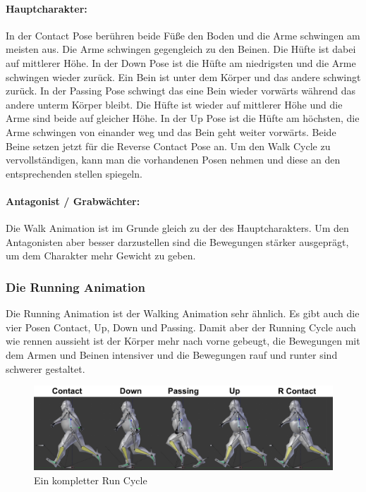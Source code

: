 \paragraph{Hauptcharakter:}
In der Contact Pose berühren beide Füße den Boden und die Arme schwingen am meisten aus. Die Arme schwingen gegengleich zu den Beinen.
Die Hüfte ist dabei auf mittlerer Höhe. In der Down Pose ist die Hüfte am niedrigsten und die Arme schwingen wieder zurück.
Ein Bein ist unter dem Körper und das andere schwingt zurück. In der Passing Pose schwingt das eine Bein wieder vorwärts während
das andere unterm Körper bleibt. Die Hüfte ist wieder auf mittlerer Höhe und die Arme sind beide auf gleicher Höhe. In der Up Pose
ist die Hüfte am höchsten, die Arme schwingen von einander weg und das Bein geht weiter vorwärts. Beide Beine setzen jetzt
für die Reverse Contact Pose an. Um den Walk Cycle zu vervollständigen, kann man die vorhandenen Posen nehmen und diese an den entsprechenden stellen spiegeln.

\paragraph{Antagonist / Grabwächter:}
Die Walk Animation ist im Grunde gleich zu der des Hauptcharakters.
Um den Antagonisten aber besser darzustellen sind die Bewegungen stärker ausgeprägt, um dem Charakter mehr Gewicht zu geben.

\subsubsection{Die Running Animation}
Die Running Animation ist der Walking Animation sehr ähnlich.
Es gibt auch die vier Posen Contact, Up, Down und Passing. Damit aber der Running Cycle auch wie rennen aussieht ist der Körper mehr nach vorne gebeugt,
die Bewegungen mit dem Armen und Beinen intensiver und die Bewegungen rauf und runter sind schwerer gestaltet.

\begin{figure}[H]
    \centering

    \includegraphics[width=.8\textwidth]{images/animation_run_cycle.png}
    \caption{Ein kompletter Run Cycle}
\end{figure}

